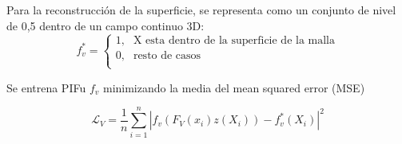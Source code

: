  Para la reconstrucción de la superficie, se representa como un conjunto de nivel de 0,5 dentro de un campo continuo 3D:
 \begin{equation}
 	f_{v}^{*} = \begin{cases}
 				1\text{,}  & \text{X esta dentro de la superficie de la malla}\\
 				0\text{,}  & \text{resto de casos}\\
 			\end{cases}
 \end{equation}

Se entrena PIFu $f_{v}$ minimizando la media del mean squared error (MSE)

\begin{equation}
	\mathcal{L}_{V} = \frac{1}{n} 
	\sum_{i=1}^{n} | f_{v} (F_{V}(x_{i}) z(X_{i})) - f_{v}^{*}(X_{i}) |^{2}
\end{equation}
 


